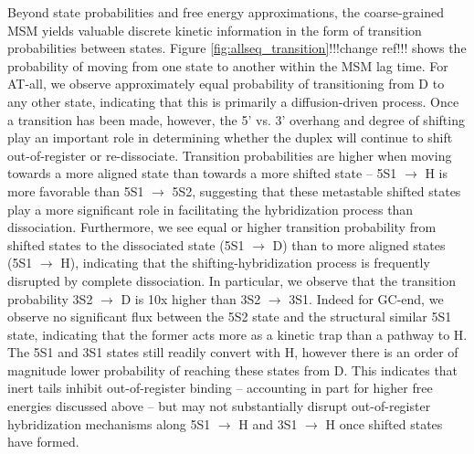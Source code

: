 \documentclass[journal=jpcbfk,manuscript=article]{achemso}
\begin{document}
Beyond state probabilities and free energy approximations, the coarse-grained MSM yields valuable discrete kinetic information in the form of transition probabilities between states. Figure \ref{fig:allseq_transition}!!!change ref!!! shows the probability of moving from one state to another within the MSM lag time. For AT-all, we observe approximately equal probability of transitioning from D to any other state, indicating that this is primarily a diffusion-driven process. Once a transition has been made, however, the 5' vs. 3' overhang and degree of shifting play an important role in determining whether the duplex will continue to shift out-of-register or re-dissociate. Transition probabilities are higher when moving towards a more aligned state than towards a more shifted state -- 5S1 $\rightarrow$ H is more favorable than 5S1 $\rightarrow$ 5S2, suggesting that these metastable shifted states play a more significant role in facilitating the hybridization process than dissociation. Furthermore, we see equal or higher transition probability from shifted states to the dissociated state (5S1 $\rightarrow$ D) than to more aligned states (5S1 $\rightarrow$ H), indicating that the shifting-hybridization process is frequently disrupted by complete dissociation. In particular, we observe that the transition probability 3S2 $\rightarrow$ D is 10x higher than 3S2 $\rightarrow$ 3S1. Indeed for GC-end, we observe no significant flux between the 5S2 state and the structural similar 5S1 state, indicating that the former acts more as a kinetic trap than a pathway to H. The 5S1 and 3S1 states still readily convert with H, however there is an order of magnitude lower probability of reaching these states from D. This indicates that inert tails inhibit out-of-register binding -- accounting in part for higher free energies discussed above -- but may not substantially disrupt out-of-register hybridization mechanisms along 5S1 $\rightarrow$ H and 3S1 $\rightarrow$ H once shifted states have formed.

\end{document}
